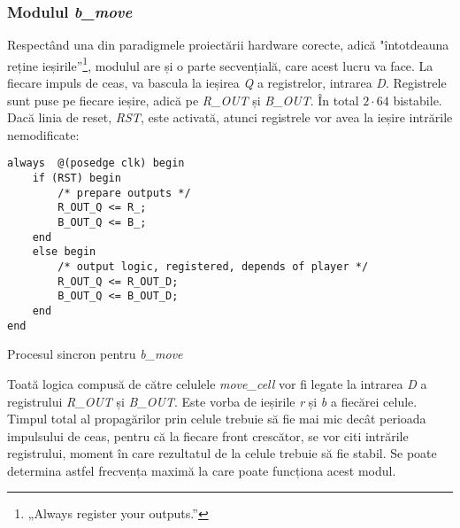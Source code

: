 \documentclass[12pt,twoside,a4paper,fleqn]{book}
\theoremstyle{definition}
\begin{document}
\subsubsection{Modulul \emph{b\_move}}
Respectând una din paradigmele proiectării hardware corecte, adică "întotdeauna reține ieșirile”\footnote{„Always register your outputs.”\cite{xilinx_coding_practices}}, modulul are și o parte secvențială, care acest lucru va face. La fiecare impuls de ceas, va bascula la ieșirea \emph{Q} a registrelor, intrarea \emph{D}. Registrele sunt puse pe fiecare ieșire, adică pe \emph{R\_OUT} și \emph{B\_OUT}. În total $2 \cdot 64$ bistabile. Dacă linia de reset, \emph{RST}, este activată, atunci registrele vor avea la ieșire intrările nemodificate:
\begin{fragmentsursa}
\begin{verbatim}
always  @(posedge clk) begin
    if (RST) begin
        /* prepare outputs */
        R_OUT_Q <= R_;
        B_OUT_Q <= B_;
    end 
    else begin
		/* output logic, registered, depends of player */
        R_OUT_Q <= R_OUT_D;
        B_OUT_Q <= B_OUT_D;
    end
end
\end{verbatim}
\caption{Procesul sincron pentru \emph{b\_move}}
\end{fragmentsursa}
Toată logica compusă de către celulele \emph{move\_cell} vor fi legate la intrarea \emph{D} a registrului \emph{R\_OUT} și \emph{B\_OUT}. Este vorba de ieșirile \emph{r} și \emph{b} a fiecărei celule. Timpul total al propagărilor prin celule trebuie să fie mai mic decât perioada impulsului de ceas, pentru că la fiecare front crescător, se vor citi intrările registrului, moment în care rezultatul de la celule trebuie să fie stabil. Se poate determina astfel frecvența maximă la care poate funcționa acest modul.\\
\end{document}
